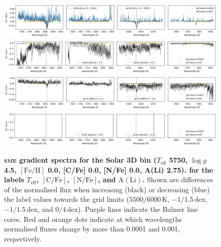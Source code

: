 \documentclass[
  journal=pasa,
  manuscript=research-paper, %
  year=2023,
  volume=37
]{cup-journal}
\newcommand{\Teff}{$T_\mathrm{eff}$\xspace}
\newcommand{\logg}{$\log g$\xspace}
\newcommand{\feh}{$\mathrm{[Fe/H]}$\xspace}
\newcommand{\vmic}{$v_\mathrm{mic}$\xspace}
\newcommand{\sme}{\textsc{sme}\xspace}
\newcommand{\dex}{\,\mathrm{dex}}	%
\newcommand{\K}{\,\mathrm{K}}	%
\begin{document}

\begin{figure}[!ht]
 \centering
 \includegraphics[width=\textwidth]{figures/gradient_spectrum_5750_4.50_0.00_teff.png}
 \includegraphics[width=\textwidth]{figures/gradient_spectrum_5750_4.50_0.00_c_fe.png}
 \includegraphics[width=\textwidth]{figures/gradient_spectrum_5750_4.50_0.00_n_fe.png}
 \includegraphics[width=\textwidth]{figures/gradient_spectrum_5750_4.50_0.00_li_fe.png} \caption{\textbf{\sme gradient spectra for the Solar 3D bin (\Teff 5750, \logg 4.5, \feh 0.0, [C/Fe] 0.0, [N/Fe] 0.0, A(Li) 2.75). for the labels \Teff, $\mathrm{[C/Fe]}$, $\mathrm{[N/Fe]}$, and $\mathrm{A(Li)}$.} Shown are differences of the normalised flux when increasing (black) or decreasing (blue) the label values towards the grid limits ($5500/6000\K$, $-1/1.5\dex$, $-1/1.5\dex$, and $0/4\dex$). Purple lines indicate the Balmer line cores. Red and orange dots indicate at which wavelengths normalised fluxes change by more than 0.0001 and 0.001, respectively.
} \label{fig:gradient_spectrum_5750_4.50_0.00}
\end{figure}
\end{document}
